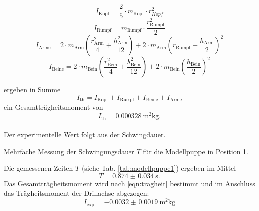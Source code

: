 \begin{equation*}
    I_\text{Kopf} = \frac{2}{5} \cdot m_\text{Kopf} \cdot r_{Kopf}^2
\end{equation*}
\begin{equation*}
    I_\text{Rumpf} = m_\text{Rumpf} \cdot \frac{r_\text{Rumpf}^2}{2}
\end{equation*}
\begin{equation*}
    I_\text{Arme} = 2 \cdot m_\text{Arm} \left(\frac{r_\text{Arm}^2}{4} + \frac{h_\text{Arm}^2}{12}\right) + 2 \cdot m_\text{Arm}\left(r_\text{Rumpf} + \frac{h_\text{Arm}}{2}\right)^2
\end{equation*}
\begin{equation*}
    I_\text{Beine} = 2 \cdot m_\text{Bein} \left(\frac{r_\text{Bein}^2}{4} + \frac{h_\text{Bein}^2}{12} \right) + 2 \cdot m_\text{Bein} \left(\frac{h_\text{Bein}}{2}\right)^2
\end{equation*}

ergeben in Summe
\begin{equation*}
    I_\text{th} = I_\text{Kopf} + I_\text{Rumpf} + I_\text{Beine} + I_\text{Arme}
\end{equation*}
ein Gesamtträgheitsmoment von
\begin{equation*}
    I_\text{th} = \SI{0.000328}{\metre^2\kg} .
\end{equation*}
\\
Der experimentelle Wert folgt aus der Schwingdauer.
\begin{table}
    \centering
    \caption{Mehrfache Messung der Schwingungsdauer $T$ für die Modellpuppe in Position 1.}
    \label{tab:modellpuppe1}  
\end{table}
Die gemessenen Zeiten $T$ (siehe Tab. \ref{tab:modellpuppe1}) ergeben im Mittel
\begin{equation*}
    T = \SI{0.874(34)}{\second} .
\end{equation*}
Das Gesamtträgheitsmoment wird nach \autoref{eqn:tragheit} bestimmt und im Anschluss das Trägheitsmoment der Drillachse abgezogen:
\begin{equation*}
    I_\text{exp} = \SI{-0.0032(19)}{\metre^2\kg}
\end{equation*}
\FloatBarrier

